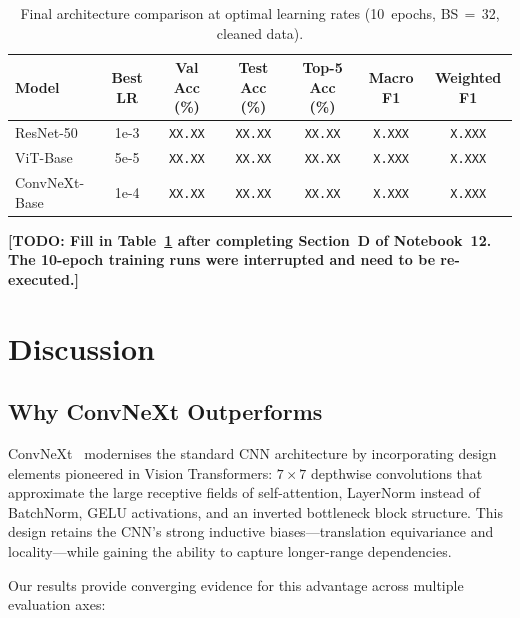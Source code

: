 \begin{table}[ht]
\centering
\caption{Final architecture comparison at optimal learning rates
         (10~epochs, BS$\,{=}\,$32, cleaned data).}
\label{tab:final-comparison}
\begin{tabular}{lcccccc}
\toprule
\textbf{Model} & \textbf{Best LR} &
  \textbf{Val Acc (\%)} & \textbf{Test Acc (\%)} &
  \textbf{Top-5 Acc (\%)} & \textbf{Macro F1} & \textbf{Weighted F1} \\
\midrule
ResNet-50     & 1e-3 & \texttt{XX.XX} & \texttt{XX.XX} & \texttt{XX.XX} & \texttt{X.XXX} & \texttt{X.XXX} \\
ViT-Base      & 5e-5 & \texttt{XX.XX} & \texttt{XX.XX} & \texttt{XX.XX} & \texttt{X.XXX} & \texttt{X.XXX} \\
ConvNeXt-Base & 1e-4 & \texttt{XX.XX} & \texttt{XX.XX} & \texttt{XX.XX} & \texttt{X.XXX} & \texttt{X.XXX} \\
\bottomrule
\end{tabular}
\end{table}

\textbf{[TODO: Fill in Table~\ref{tab:final-comparison} after completing
Section~D of Notebook~12.  The 10-epoch training runs were interrupted
and need to be re-executed.]}

\section{Discussion}\label{sec:discussion}

\subsection{Why ConvNeXt Outperforms}\label{sec:why-convnext}

ConvNeXt~\cite{liu2022convnet} modernises the standard CNN architecture
by incorporating design elements pioneered in Vision Transformers:
$7{\times}7$ depthwise convolutions that approximate the large receptive
fields of self-attention, LayerNorm instead of BatchNorm, GELU
activations, and an inverted bottleneck block structure.  This design
retains the CNN's strong inductive biases---translation equivariance and
locality---while gaining the ability to capture longer-range
dependencies.

Our results provide converging evidence for this advantage across
multiple evaluation axes:

